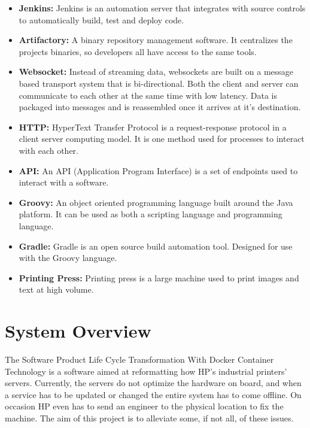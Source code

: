 \documentclass[onecolumn, draftclsnofoot,10pt, compsoc]{IEEEtran}
\begin{document}
\begin{itemize}
\item \textbf{Jenkins:} Jenkins is an automation server that integrates with source controls to automatically build, test and deploy code.

\item \textbf{Artifactory:} A binary repository management software. It centralizes the projects binaries, so developers all have access to the same tools.

\item \textbf{Websocket:} Instead of streaming data, websockets are built on a message based transport system that is bi-directional.
Both the client and server can communicate to each other at the same time with low latency.
Data is packaged into messages and is reassembled once it arrives at it's destination.

\item \textbf{HTTP:} HyperText Transfer Protocol is a request-response protocol in a client server computing model. It is one method used for processes to interact with each other.


\item \textbf{API:} An API (Application Program Interface) is a set of endpoints used to interact with a software.

\item \textbf{Groovy:} An object oriented programming language built around the Java platform. It can be used as both a scripting language and programming language.

\item \textbf{Gradle:} Gradle is an open source build automation tool. Designed for use with the Groovy language.

\item \textbf{Printing Press:} Printing press is a large machine used to print images and text at high volume.



\end{itemize}

\section{System Overview}

The Software Product Life Cycle Transformation With Docker Container Technology is a software aimed at reformatting how HP’s industrial printers' servers. Currently, the servers do not optimize the hardware on board, and when a service has to be updated or changed the entire system has to come offline. On occasion HP even has to send an engineer to the physical location to fix the machine. The aim of this project is to alleviate some, if not all, of these issues.
\end{document}

